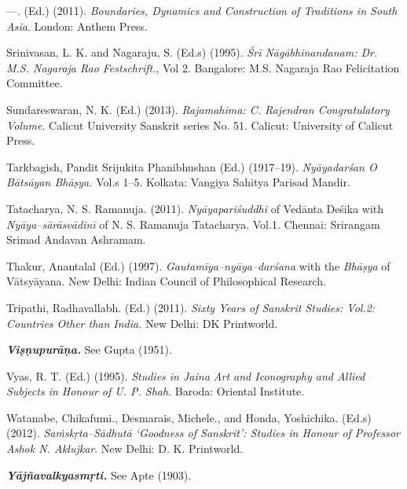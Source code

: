 \begin{thebibliography}{99}
 \item —. (Ed.) (2011). \textit{Boundaries, Dynamics and Construction of Traditions in South Asia}. London: Anthem Press.

 \item Srinivasan, L. K. and Nagaraju, S. (Ed.s) (1995). \textit{Śrī Nāgābhinandanam: Dr. M.S. Nagaraja Rao Festschrift.}, Vol 2. Bangalore: M.S. Nagaraja Rao Felicitation Committee.

 \item Sundareswaran, N. K. (Ed.) (2013).\textit{ Rajamahima: C. Rajendran Congratulatory Volume}. Calicut University Sanskrit series No. 51. Calicut: University of Calicut Press.

 \item Tarkbagish, Pandit Srijukita Phanibhushan (Ed.) (1917–19). \textit{Nyāyadarśan O Bātsāyan Bhāṣya.} Vol.s 1–5. Kolkata: Vangiya Sahitya Parisad Mandir.

 \item Tatacharya, N. S. Ramanuja. (2011). \textit{Nyāyapariśuddhi} of Vedānta Deśika with \textit{Nyāya–sārāsvādinī} of N. S. Ramanuja Tatacharya. Vol.1. Chennai: Srirangam Srimad Andavan Ashramam.

 \item Thakur, Anantalal (Ed.) (1997). \textit{Gautamīya–nyāya–darśana} with the \textit{Bhāṣya} of Vātsyāyana. New Delhi: Indian Council of Philosophical Research.

 \item Tripathi, Radhavallabh. (Ed.) (2011). \textit{Sixty Years of Sanskrit Studies: Vol.2: Countries Other than India. }New Delhi: DK Printworld.

 \item \textit{\textbf{Viṣṇupurāṇa.}} See Gupta (1951).

 \item Vyas, R. T. (Ed.) (1995). \textit{Studies in Jaina Art and Iconography and Allied Subjects in Honour of U. P. Shah}. Baroda: Oriental Institute.

 \item Watanabe, Chikafumi., Desmarais, Michele., and Honda, Yoshichika. (Ed.s) (2012). \textit{Saṁskṛta–Sādhutā ‘Goodness of Sanskrit’: Studies in Honour of Professor Ashok N. Aklujkar}. New Delhi: D. K. Printworld.

 \item \textit{\textbf{Yājñavalkyasmṛti.}} See Apte (1903).

 \end{thebibliography}

